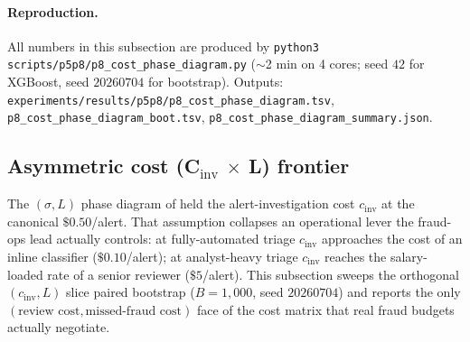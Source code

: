\paragraph{Reproduction.} All numbers in this subsection are produced
by \texttt{python3 scripts/p5p8/p8\_cost\_phase\_diagram.py} ($\sim$2 min
on 4 cores; seed $42$ for XGBoost, seed $20260704$ for bootstrap).
Outputs:
\texttt{experiments/results/p5p8/p8\_cost\_phase\_diagram.tsv},
\texttt{p8\_cost\_phase\_diagram\_boot.tsv},
\texttt{p8\_cost\_phase\_diagram\_summary.json}.

\subsection{Asymmetric cost (C$_\text{inv}$ $\times$ L) frontier}
\label{sec:p8-asymm-cost}

The $(\sigma, L)$ phase diagram of 
held the alert-investigation cost $c_\text{inv}$ at the canonical
$\$0.50$/alert. That assumption collapses an operational lever the
fraud-ops lead actually controls: at fully-automated triage
$c_\text{inv}$ approaches the cost of an inline classifier
($\$0.10$/alert); at analyst-heavy triage $c_\text{inv}$ reaches the
salary-loaded rate of a senior reviewer ($\$5$/alert). This subsection
sweeps the orthogonal $(c_\text{inv}, L)$ slice paired bootstrap ($B{=}1{,}000$,
seed $20260704$) and reports the only $(\text{review cost},
\text{missed-fraud cost})$ face of the cost matrix that real fraud
budgets actually negotiate.

